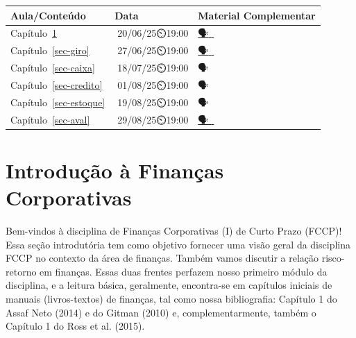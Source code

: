 \documentclass[
  a4paper,
]{book}
\begin{document}
\begin{longtable}[]{@{}
  >{\raggedright\arraybackslash}p{}
  >{\centering\arraybackslash}p{}
  >{\centering\arraybackslash}p{}@{}}
\toprule\noalign{}
\begin{minipage}[b]{\linewidth}\raggedright
Aula/Conteúdo
\end{minipage} & \begin{minipage}[b]{\linewidth}\centering
Data
\end{minipage} & \begin{minipage}[b]{\linewidth}\centering
Material Complementar
\end{minipage} \\
\midrule\noalign{}
\endhead
\bottomrule\noalign{}
\endlastfoot
Capítulo~\ref{sec-intro} & 📅20/06/25⏲️19:00 &
\href{./resources/intro-ppt.html}{🗣}\href{https://youtu.be/oN2CVy1lHGc}{🎥}\href{https://medium.com/@fabiofigueiredo_44303/resenha-do-livro-desafio-aos-deuses-a-hist\%C3\%B3ria-do-risco-9607fab2aa30}{📓} \\
Capítulo~\ref{sec-giro} & 📅27/06/25⏲️19:00 &
\href{./resources/giro-ppt.html}{🗣}\href{https://youtu.be/p2tTUL2QILo?si=m4GFKwyvEaDLkMpJ}{🎥}\href{https://journalppc.com/RPPC/article/view/1229}{📓} \\
Capítulo~\ref{sec-caixa} & 📅18/07/25⏲️19:00 & 🗣🎥📓 \\
Capítulo~\ref{sec-credito} & 📅01/08/25⏲️19:00 & 🗣🎥📓 \\
Capítulo~\ref{sec-estoque} & 📅19/08/25⏲️19:00 & 🗣🎥📓 \\
Capítulo~\ref{sec-aval} & 📅29/08/25⏲️19:00 &
\href{./resources/teorias-ppt.html}{🗣}\href{https://www.youtube.com/live/OCt4f9IdO6U?si=tVw5wrVo7cVmkptu}{🎥}\href{https://periodicos.fclar.unesp.br/iniciativa/article/view/19172}{📓} \\
\end{longtable}


\chapter{Introdução à Finanças Corporativas}\label{sec-intro}

Bem-vindos à disciplina de Finanças Corporativas (I) de Curto Prazo
(FCCP)! Essa seção introdutória tem como objetivo fornecer uma visão
geral da disciplina FCCP no contexto da área de finanças. Também vamos
discutir a relação risco-retorno em finanças. Essas duas frentes
perfazem nosso primeiro módulo da disciplina, e a leitura básica,
geralmente, encontra-se em capítulos iniciais de manuais (livros-textos)
de finanças, tal como nossa bibliografia: Capítulo 1 do Assaf Neto
(2014) e do Gitman (2010) e, complementarmente, também o Capítulo 1 do
Ross et al. (2015).
\end{document}
